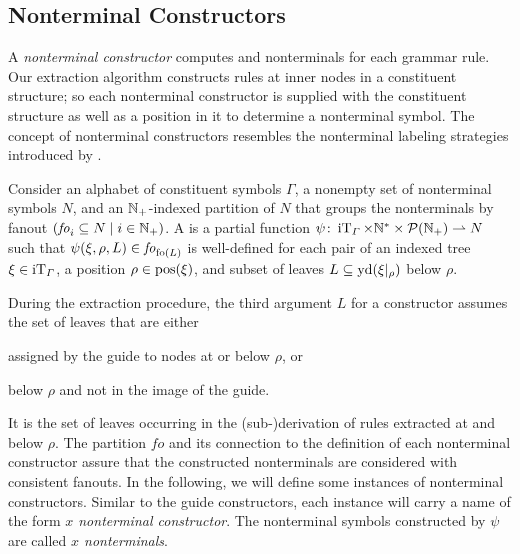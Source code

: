 \documentclass[../../document.tex]{subfiles}
\begin{document}
    \subsection{Nonterminal Constructors}\label{sec:ntconstructors}
    A \emph{nonterminal constructor} computes  and  nonterminals for each grammar rule.
    Our extraction algorithm constructs rules at inner nodes in a constituent structure; so each nonterminal constructor is supplied with the constituent structure as well as a position in it to determine a nonterminal symbol.
    The concept of nonterminal constructors resembles the nonterminal labeling strategies introduced by \citet[Section~6.2]{Geb20}.

    \begin{definition}
        Consider an alphabet of constituent symbols \(\varGamma\), a nonempty set of nonterminal symbols \(N\), and an \(\mathbb{N}_+\)-indexed partition of \(N\) that groups the nonterminals by fanout \((\mathit{fo}_i \subseteq N \mid i \in \mathbb{N}_+)\).
        A  is a partial function \(\psi\colon \operatorname{iT}_\varGamma \times \mathbb{N}^* \times \mathcal{P}(\mathbb{N}_+) \rightharpoonup N\) such that \(\psi(\xi, \rho, L) \in \mathit{fo}_{\operatorname{fo}(L)}\) is well-defined for each pair of an indexed tree \(\xi \in \operatorname{iT}_\varGamma\), a position \(\rho \in \operatorname{pos}(\xi)\), and subset of leaves \(L \subseteq \operatorname{yd}(\xi|_\rho)\) below \(\rho\).
    \end{definition}

    During the extraction procedure, the third argument \(L\) for a constructor assumes the set of leaves that are either
    \begin{inparaenum}
        \item assigned by the guide to nodes at or below \(\rho\), or
        \item below \(\rho\) and not in the image of the guide.
    \end{inparaenum}
    It is the set of leaves occurring in the (sub-)derivation of rules extracted at and below \(\rho\).
    The partition \(\mathit{fo}\) and its connection to the definition of each nonterminal constructor assure that the constructed nonterminals are considered with consistent fanouts.
    In the following, we will define some instances of nonterminal constructors.
    Similar to the guide constructors, each instance will carry a name of the form \emph{\(x\) nonterminal constructor}.
    The nonterminal symbols constructed by \(\psi\) are called \emph{\(x\) nonterminals}.
\end{document}
